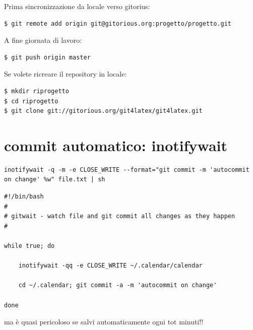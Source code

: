 \documentclass[a4paper,12pt,oneside]{article}
\begin{document}
Prima sincronizzazione da locale verso gitorius:
\begin{lstlisting}
$ git remote add origin git@gitorious.org:progetto/progetto.git
\end{lstlisting}

A fine giornata di lavoro:
\begin{lstlisting}
$ git push origin master
\end{lstlisting}

Se volete ricreare il repository in locale:
\begin{lstlisting}
$ mkdir riprogetto
$ cd riprogetto
$ git clone git://gitorious.org/git4latex/git4latex.git
\end{lstlisting}

\section{commit automatico: inotifywait}

\begin{lstlisting}
inotifywait -q -m -e CLOSE_WRITE --format="git commit -m 'autocommit on change' %w" file.txt | sh
\end{lstlisting}

\begin{lstlisting}
#!/bin/bash
#
# gitwait - watch file and git commit all changes as they happen
#

while true; do

    inotifywait -qq -e CLOSE_WRITE ~/.calendar/calendar

    cd ~/.calendar; git commit -a -m 'autocommit on change'

done
\end{lstlisting}
ma è quasi pericoloso se salvi automaticamente ogni tot minuti!!
\end{document}
